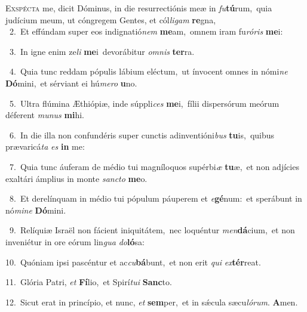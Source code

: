 \lettrine{\initial\textcolor{\initialcolor}{E}}{xspécta} me, dicit Dóminus, in die resurrectiónis meæ in \textit{fu}\-\textbf{tú}rum,~\star quia judícium meum, ut cóngregem Gentes, et cól\-\textit{li}\-\textit{gam} \textbf{re}\-gna,\\
{\numbfont\textcolor{\numbcolor}{~2.}}~Et effúndam super eos indignatió\textit{nem} \textbf{me}\-am,~\star omnem iram fu\-\textit{ró}\-\textit{ris} \textbf{me}\-i:\par
{\numbfont\textcolor{\numbcolor}{~3.}}~In igne enim ze\textit{li} \textbf{me}\-i~\star devorábitur \textit{om}\-\textit{nis} \textbf{ter}\-ra.\par
{\numbfont\textcolor{\numbcolor}{~4.}}~Quia tunc reddam pópulis lábium eléctum,~\dagger ut ínvocent omnes in nómi\textit{ne} \textbf{Dó}\-mini,~\star et sérviant ei hú\-\textit{me}\-\textit{ro} \textbf{u}\-no.\par
{\numbfont\textcolor{\numbcolor}{~5.}}~Ultra flúmina Æthiópiæ, inde súppli\textit{ces} \textbf{me}\-i,~\star fílii dispersórum meórum déferent \textit{mu}\-\textit{nus} \textbf{mi}\-hi.\par
{\numbfont\textcolor{\numbcolor}{~6.}}~In die illa non confundéris super cunctis adinventióni\textit{bus} \textbf{tu}\-is,~\star quibus prævaricá\textit{ta} \textit{es} \textbf{in} me:\par
{\numbfont\textcolor{\numbcolor}{~7.}}~Quia tunc áuferam de médio tui magníloquos supérbi\textit{æ} \textbf{tu}\-æ,~\star et non adjícies exaltári ámplius in monte \textit{sanc}\-\textit{to} \textbf{me}\-o.\par
{\numbfont\textcolor{\numbcolor}{~8.}}~Et derelínquam in médio tui pópulum páuperem et \textit{e}\-\textbf{gé}num:~\star et sperábunt in nó\-\textit{mi}\-\textit{ne} \textbf{Dó}\-mini.\par
{\numbfont\textcolor{\numbcolor}{~9.}}~Relíquiæ Israël non fácient iniquitátem,~\dagger nec loquéntur \textit{men}\-\textbf{dá}cium,~\star et non inveniétur in ore eórum lin\textit{gua} \textit{do}\-\textbf{ló}sa:\par
{\numbfont\textcolor{\numbcolor}{10.}}~Quóniam ipsi pascéntur et ac\-\textit{cu}\-\textbf{bá}bunt,~\star et non erit \textit{qui} \textit{ex}\-\textbf{tér}reat.\par
{\numbfont\textcolor{\numbcolor}{11.}}~Glória Patri, \textit{et} \textbf{Fí}\-lio,~\star et Spirí\-\textit{tu}\-\textit{i} \textbf{Sanc}\-to.\par
{\numbfont\textcolor{\numbcolor}{12.}}~Sicut erat in princípio, et nunc, \textit{et} \textbf{sem}\-per,~\star et in sǽcula sæcu\-\textit{ló}\-\textit{rum}. \textbf{A}\-men.\par
